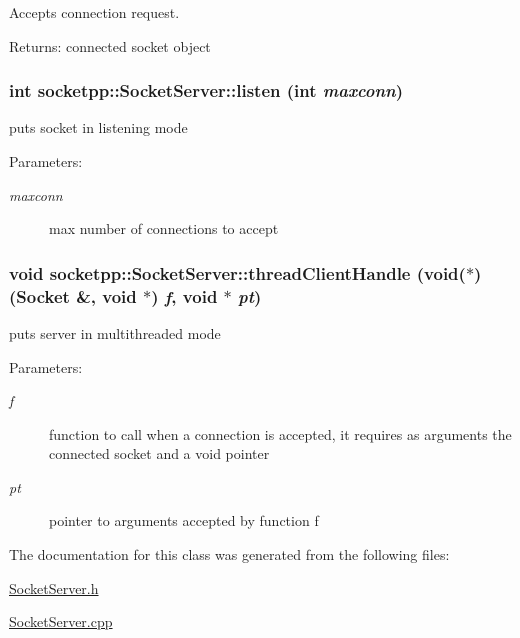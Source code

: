 Accepts connection request. 

\begin{Desc}
\item[Returns:]connected socket object \end{Desc}
\hypertarget{classsocketpp_1_1SocketServer_034ddc2def5342b5a26264ffcb9e8e36}{
\subsubsection[{listen}]{\setlength{\rightskip}{0pt plus 5cm}int socketpp::SocketServer::listen (int {\em maxconn})}}
\label{classsocketpp_1_1SocketServer_034ddc2def5342b5a26264ffcb9e8e36}


puts socket in listening mode 

\begin{Desc}
\item[Parameters:]
\begin{description}
\item[{\em maxconn}]max number of connections to accept \end{description}
\end{Desc}
\hypertarget{classsocketpp_1_1SocketServer_0ded92a6348a6cf953d9f646fac43ac2}{
\subsubsection[{threadClientHandle}]{\setlength{\rightskip}{0pt plus 5cm}void socketpp::SocketServer::threadClientHandle (void($\ast$)({\bf Socket} \&, void $\ast$) {\em f}, \/  void $\ast$ {\em pt})}}
\label{classsocketpp_1_1SocketServer_0ded92a6348a6cf953d9f646fac43ac2}


puts server in multithreaded mode 

\begin{Desc}
\item[Parameters:]
\begin{description}
\item[{\em f}]function to call when a connection is accepted, it requires as arguments the connected socket and a void pointer \item[{\em pt}]pointer to arguments accepted by function f \end{description}
\end{Desc}


The documentation for this class was generated from the following files:\begin{CompactItemize}
\item 
\hyperlink{SocketServer_8h}{SocketServer.h}\item 
\hyperlink{SocketServer_8cpp}{SocketServer.cpp}\end{CompactItemize}
